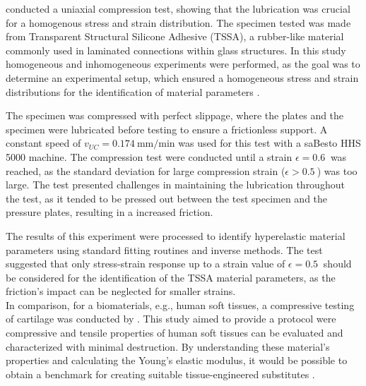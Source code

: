 \citet{Drass2018} conducted a uniaxial compression test, showing that the lubrication was 
crucial for a homogenous stress and strain distribution. The specimen tested was made from Transparent Structural 
Silicone Adhesive (TSSA), a rubber-like material commonly used in laminated connections within glass structures.
In this study homogeneous and inhomogeneous experiments were performed, as the goal was to determine an 
experimental setup, which ensured a homogeneous stress and strain distributions for the identification of material parameters \cite{Drass2018}.

The specimen was compressed with perfect slippage, where the plates and the specimen were lubricated 
before testing to ensure a frictionless support. A constant speed of $v_{UC}=\SI[per-mode = symbol]{0.174}{\milli \m\per \minute}$
was used for this test with a saBesto HHS 5000 machine. The compression test were conducted until a strain $\epsilon=\SI{0.6}{}$ 
was reached, as the standard deviation for large compression strain ($\epsilon > \SI{0.5}{}$) was too large.
The test presented challenges in maintaining the lubrication throughout the test, as it tended to be 
pressed out between the test specimen and the pressure plates, resulting in a increased friction. 

The results of this experiment were processed to identify hyperelastic material parameters using standard 
fitting routines and inverse methods. The test suggested that only stress-strain response up to a strain value of 
$\epsilon=\SI{0.5}{}$ should be considered for the identification of the TSSA material parameters, as 
the friction's impact can be neglected for smaller strains.\\

In comparison, for a biomaterials, e.g., human soft tissues, a compressive testing of cartilage was conducted by \citet{Griffin2016}. 
This study aimed to provide a protocol were compressive and tensile properties of human soft tissues can be evaluated 
and characterized with minimal destruction. By understanding these material's properties and calculating the Young's 
elastic modulus, it would be possible to obtain a benchmark for creating suitable tissue-engineered substitutes \cite{Griffin2016}. 

